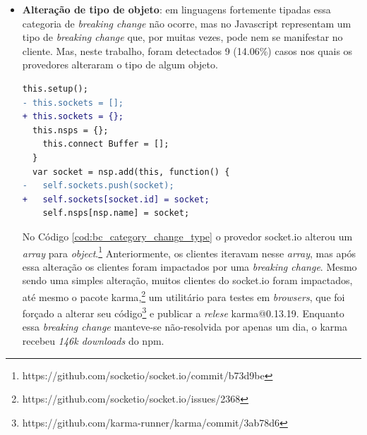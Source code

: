 \begin{itemize}
    \begin{lstlisting}[numbers=none, language=diff, label=cod:bc_category_incompatibles_providers, caption={Exemplo da categoria \textit{Provedores incompatíveis}}]
  }
-   },
-   visitClass: {
+ }, {
+   key: 'visitClass',
        value: function visitClass(node) {
    \end{lstlisting}

    A \textit{release} \textsf{escope@3.4} realizou uma alteração no seu código, conforme o Código \ref{cod:bc_category_incompatibles_providers}, mas que não reflete em um erro. Essa alteração impactou diretamente o pacote \textsf{babel-eslint}, mesmo o pacote \textsf{escope} não sendo um provedor direto do \textsf{babel-eslint} e não ter introduzido um erro.\footnote{https://github.com/estools/escope/issues/99\#issuecomment-178151491} Com isso, houve uma incompatibilidade entre os provedores e essa incompatibilidade precisou ser corrigida pelo \textsf{babel-eslint}. Essa \textit{breaking change} manteve-se não-consertada por apenas um dia, mas durante esse período o \textsf{babel-eslint} foi descarregado \textit{80k} vezes do \textsf{npm}.

    \item \textbf{Alteração de tipo de objeto}: em linguagens fortemente tipadas essa categoria de \textit{breaking change} não ocorre, mas no \textsf{Javascript} representam um tipo de \textit{breaking change} que, por muitas vezes, pode nem se manifestar no cliente. Mas, neste trabalho, foram detectados 9 (14.06\%) casos nos quais os provedores alteraram o tipo de algum objeto.

    \begin{lstlisting}[numbers=none, language=diff, label=cod:bc_category_change_type, caption={Exemplo da categoria \textit{Alteração de tipo de objeto}}]
  this.setup();
- this.sockets = [];
+ this.sockets = {};
  this.nsps = {};
    this.connect Buffer = [];
  }
  var socket = nsp.add(this, function() {
-   self.sockets.push(socket);
+   self.sockets[socket.id] = socket;
    self.nsps[nsp.name] = socket;
    \end{lstlisting}

    No Código \ref{cod:bc_category_change_type} o provedor \textsf{socket.io} alterou um \textit{array} para \textit{object}.\footnote{https://github.com/socketio/socket.io/commit/b73d9be} Anteriormente, os clientes iteravam nesse \textit{array}, mas após essa alteração os clientes foram impactados por uma \textit{breaking change}. Mesmo sendo uma simples alteração, muitos clientes do \textsf{socket.io} foram impactados, até mesmo o pacote \textsf{karma},\footnote{https://github.com/socketio/socket.io/issues/2368} um utilitário para testes em \textit{browsers}, que foi forçado a alterar seu código\footnote{https://github.com/karma-runner/karma/commit/3ab78d6} e publicar a \textit{relese} \textsf{karma@0.13.19}. Enquanto essa \textit{breaking change} manteve-se não-resolvida por apenas um dia, o \textsf{karma} recebeu \textit{146k downloads} do \textsf{npm}.


\end{itemize}
